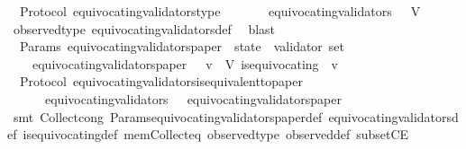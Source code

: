 \begin{isabellebody}
\isanewline
{}\isamarkupfalse%
\ {\isacharparenleft}\ Protocol{\isacharparenright}\ equivocating{\isacharunderscore}validators{\isacharunderscore}type\ {\isacharcolon}\isanewline
\ \ {\isachardoublequoteopen}{\isasymforall}\ {\isasymsigma}\ {\isasymin}\ {\isasymSigma}{\isachardot}\ equivocating{\isacharunderscore}validators\ {\isasymsigma}\ {\isasymsubseteq}\ V{\isachardoublequoteclose}\isanewline
%
\isadelimproof
\ \ %
\endisadelimproof
%
\isatagproof
{}\isamarkupfalse%
\ observed{\isacharunderscore}type\ equivocating{\isacharunderscore}validators{\isacharunderscore}def\ \isamarkupfalse%
\ blast%
\endisatagproof
{\isafoldproof}%
%
\isadelimproof
\isanewline
%
\endisadelimproof
\isanewline
{}\isamarkupfalse%
\ {\isacharparenleft}\ Params{\isacharparenright}\ equivocating{\isacharunderscore}validators{\isacharunderscore}paper\ {\isacharcolon}{\isacharcolon}\ {\isachardoublequoteopen}state\ {\isasymRightarrow}\ validator\ set{\isachardoublequoteclose}\isanewline
\ \ \isanewline
\ \ \ \ {\isachardoublequoteopen}equivocating{\isacharunderscore}validators{\isacharunderscore}paper\ {\isasymsigma}\ {\isacharequal}\ {\isacharbraceleft}v\ {\isasymin}\ V{\isachardot}\ is{\isacharunderscore}equivocating\ {\isasymsigma}\ v{\isacharbraceright}{\isachardoublequoteclose}\isanewline
\isanewline
{}\isamarkupfalse%
\ {\isacharparenleft}\ Protocol{\isacharparenright}\ equivocating{\isacharunderscore}validators{\isacharunderscore}is{\isacharunderscore}equivalent{\isacharunderscore}to{\isacharunderscore}paper\ {\isacharcolon}\isanewline
\ \ {\isachardoublequoteopen}{\isasymforall}\ {\isasymsigma}\ {\isasymin}\ {\isasymSigma}{\isachardot}\ equivocating{\isacharunderscore}validators\ {\isasymsigma}\ {\isacharequal}\ equivocating{\isacharunderscore}validators{\isacharunderscore}paper\ {\isasymsigma}{\isachardoublequoteclose}\isanewline
%
\isadelimproof
\ \ %
\endisadelimproof
%
\isatagproof
{}\isamarkupfalse%
\ {\isacharparenleft}smt\ Collect{\isacharunderscore}cong\ Params{\isachardot}equivocating{\isacharunderscore}validators{\isacharunderscore}paper{\isacharunderscore}def\ equivocating{\isacharunderscore}validators{\isacharunderscore}def\ is{\isacharunderscore}equivocating{\isacharunderscore}def\ mem{\isacharunderscore}Collect{\isacharunderscore}eq\ observed{\isacharunderscore}type\ observed{\isacharunderscore}def\ subsetCE{\isacharparenright}%
\endisatagproof
{\isafoldproof}%
%
\isadelimproof
\isanewline
%
\endisadelimproof

\end{isabellebody}
